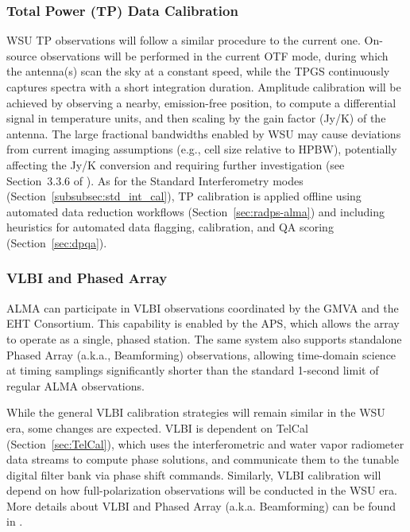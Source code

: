 

\subsubsection{Total Power (TP) Data Calibration}
WSU \ac{TP} observations will follow a similar procedure to the current one. On-source observations will be performed in the current \ac{OTF} mode, during which the antenna(s) scan the sky at a constant speed, while the \ac{TPGS} continuously captures spectra with a short integration duration.
Amplitude calibration will be achieved by observing a nearby, emission-free
position, to compute a differential signal in temperature units, and then scaling by the gain factor (Jy/K) of the antenna.
The large fractional bandwidths enabled by WSU may cause deviations from current imaging assumptions (e.g., cell size relative to HPBW), potentially affecting the Jy/K conversion and requiring further investigation (see Section~3.3.6 of \cite{CSA-IA}). As for the Standard Interferometry modes (Section~\ref{subsubsec:std_int_cal}), TP calibration is applied offline using automated data reduction workflows (Section~\ref{sec:radps-alma}) and including heuristics for automated data flagging, calibration, and QA scoring (Section~\ref{sec:dpqa}).



\subsubsection{VLBI and Phased Array}\label{sub:vlbi}
ALMA can participate in \ac{VLBI} observations coordinated by the \ac{GMVA} and the \ac{EHT} Consortium. This capability is enabled by the \ac{APS}, which allows the array to operate  as a single, phased station. The same system also supports standalone Phased Array (a.k.a., Beamforming) observations, allowing time-domain science at timing samplings significantly shorter than the  standard 1-second limit of regular ALMA observations. 

While the general VLBI calibration strategies will remain similar in the WSU era, some changes are expected. VLBI is dependent on \ac{TelCal} (Section~\ref{sec:TelCal}), which uses the interferometric and water vapor radiometer data streams to compute phase solutions, and communicate them  to the tunable digital filter bank via phase shift commands.
Similarly, VLBI calibration will depend on how full-polarization observations will be conducted in the WSU era. More details about VLBI and Phased Array (a.k.a. Beamforming) can be found in \cite{acsos}.



